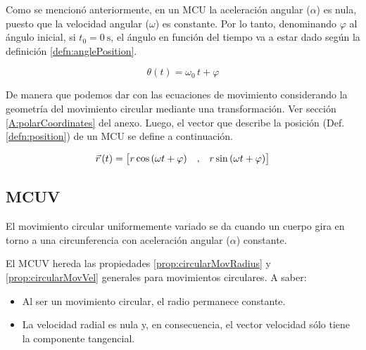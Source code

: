 Como se mencionó anteriormente, en un MCU la aceleración angular ($\alpha$) es nula, puesto que la velocidad angular ($\omega$) es constante.
Por lo tanto, denominando $\varphi$ al ángulo inicial, si $t_0=\SI{0}{\second}$, el ángulo en función del tiempo va a estar dado según la definición \ref{defn:anglePosition}.

\begin{mdframed}[style=PropertyFrame]
    \begin{prop}
    \end{prop}
    \begin{equation*}
        \theta (t) = \omega_0 \, t + \varphi
    \end{equation*}
\end{mdframed}

De manera que podemos dar con las ecuaciones de movimiento considerando la geometría del movimiento circular mediante una transformación.
Ver sección \ref{A:polarCoordinates} del anexo.
Luego, el vector que describe la posición (Def. \ref{defn:position}) de un MCU se define a continuación.

\begin{mdframed}[style=DefinitionFrame]
    \begin{defn}
        \label{defn:MCUmovementEqns}
    \end{defn}
    \begin{equation*}
        \vec{r}\hspace{0.05cm}(t) = { \begin{bmatrix} r \cos{(\omega t + \varphi)} &,& r \sin{(\omega t + \varphi)} \end{bmatrix} }
    \end{equation*}
\end{mdframed}


\subsection{MCUV}

El movimiento circular uniformemente variado se da cuando un cuerpo gira en torno a una circunferencia con aceleración angular ($\alpha$) constante.

El MCUV hereda las propiedades \ref{prop:circularMovRadius} y \ref{prop:circularMovVel} generales para movimientos circulares.
A saber:
\begin{itemize}
    \item Al ser un movimiento circular, el radio permanece constante.
    
    \item La velocidad radial es nula y, en consecuencia, el vector velocidad sólo tiene la componente tangencial.
\end{itemize}

